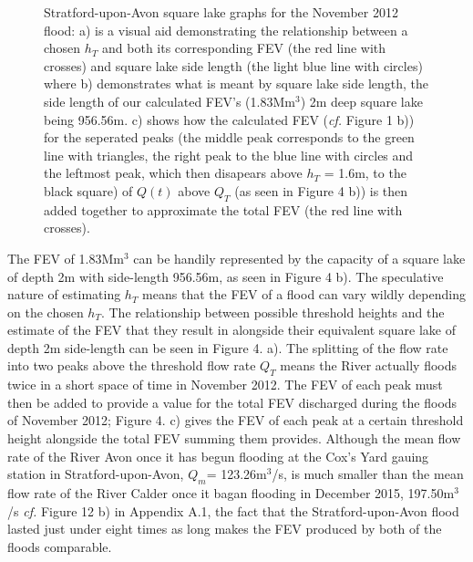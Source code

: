 \documentclass[11pt,a4paper]{article}
\begin{document}
\begin{figure}[ht!]
\centering
{}
\hfill
{}
\caption{Stratford-upon-Avon square lake graphs for the November 2012 flood: a) is a visual aid demonstrating the relationship between a chosen $h_T$ and both its corresponding FEV (the red line with crosses) and square lake side length (the light blue line with circles) where b) demonstrates what is meant by square lake side length, the side length of our calculated FEV's (1.83Mm$^3$) 2m deep square lake being 956.56m. c) shows how the calculated FEV (\textit{cf.} Figure 1 b)) for the seperated peaks (the middle peak corresponds to the green line with triangles, the right peak to the blue line with circles and the leftmost peak, which then disapears above $h_T$ = 1.6m, to the black square) of $Q(t)$ above $Q_T$ (as seen in Figure 4 b)) is then added together to approximate the total FEV (the red line with crosses).}
\end{figure}

The FEV of 1.83Mm$^3$ can be handily represented by the capacity of a square lake of depth 2m with side-length 956.56m, as seen in Figure 4 b). The speculative nature of estimating $h_T$ means that the FEV of a flood can vary wildly depending on the chosen $h_T$. The relationship between possible threshold heights and the estimate of the FEV that they result in alongside their equivalent square lake of depth 2m side-length can be seen in Figure 4. a). The splitting of the flow rate into two peaks above the threshold flow rate $Q_T$ means the River actually floods twice in a short space of time in November 2012. The FEV of each peak must then be added to provide a value for the total FEV discharged during the floods of November 2012{;} Figure 4. c) gives the FEV of each peak at a certain threshold height alongside the total FEV summing them provides. Although the mean flow rate of the River Avon once it has begun flooding at the Cox's Yard gauing station in Stratford-upon-Avon, $Q_m$= 123.26m$^3$/s, is much smaller than the mean flow rate of the River Calder once it bagan flooding in December 2015, 197.50m$^3$/s \textit{cf.} Figure 12 b) in Appendix A.1, the fact that the Stratford-upon-Avon flood lasted just under eight times as long makes the FEV produced by both of the floods comparable. 
\end{document}
